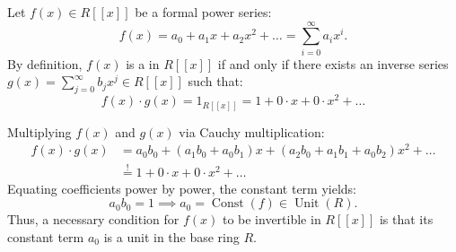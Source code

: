 \begin{content}
Let $f(x) \in R[[x]]$ be a formal power series:
\begin{equation}\label{eq:f-series-def}
f(x) = a_0 + a_1 x + a_2 x^2 + \dots = \sum_{i=0}^\infty a_i x^i.
\end{equation}
By definition, $f(x)$ is a  in $R[[x]]$ if and only if there exists an inverse series $g(x) = \sum_{j=0}^\infty b_j x^j \in R[[x]]$ such that:
\begin{equation}\label{eq:fg-equals-one}
f(x) \cdot g(x) = 1_{R[[x]]} = 1 + 0 \cdot x + 0 \cdot x^2 + \dots
\end{equation}
\end{content}

\begin{content}
Multiplying $f(x)$ and $g(x)$ via Cauchy multiplication:
\begin{align}
    f(x) \cdot g(x) &= a_0 b_0 + (a_1 b_0 + a_0 b_1) x + (a_2 b_0 + a_1 b_1 + a_0 b_2) x^2 + \dots \nonumber \\
    &\stackrel{!}{=} 1 + 0 \cdot x + 0 \cdot x^2 + \dots \label{eq:fg-expansion-matched}
\end{align}
Equating coefficients power by power, the constant term yields:
\begin{equation}\label{eq:const-coeff-relation}
a_0 b_0 = 1 \implies a_0 = \operatorname{Const}(f) \in \operatorname{Unit}(R).
\end{equation}
Thus, a necessary condition for $f(x)$ to be invertible in $R[[x]]$ is that its constant term $a_0$ is a unit in the base ring $R$.
\end{content}


